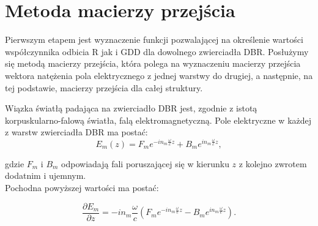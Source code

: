 \section{Metoda macierzy przejścia} \label{macierz} %

Pierwszym etapem jest wyznaczenie funkcji pozwalającej na określenie wartości współczynnika odbicia R jak i GDD dla dowolnego zwierciadła DBR. Posłużymy się metodą macierzy przejścia, która polega na wyznaczeniu macierzy przejścia wektora natężenia pola elektrycznego z jednej warstwy do drugiej, a następnie, na tej podstawie, macierzy przejścia dla całej struktury.

Wiązka światłą padająca na zwierciadło DBR jest, zgodnie z istotą korpuskularno-falową światła, falą elektromagnetyczną. Pole elektryczne w każdej z warstw zwierciadła DBR ma postać:
\begin{equation}
    E_m(z) = F_me^{-in_m \frac\omega c z} + B_me^{in_m \frac\omega c z},
\end{equation}

gdzie $F_m$ i $B_m$ odpowiadają fali poruszającej się w kierunku $z$ z kolejno zwrotem dodatnim i ujemnym. \\
Pochodna powyższej wartości ma postać: 

\begin{equation}
    \frac{\partial E_m}{\partial z} = -i n_m \frac\omega c(F_me^{-in_m \frac\omega cz} - B_me^{in_m \frac\omega cz}).
\end{equation}

